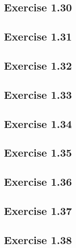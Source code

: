 \documentclass[letterpaper, leqno]{article}
\begin{document}
\subsection*{Exercise 1.30}
%

\subsection*{Exercise 1.31}
%

\subsection*{Exercise 1.32}
%

\subsection*{Exercise 1.33}
%

\subsection*{Exercise 1.34}
%

\subsection*{Exercise 1.35}
%

\subsection*{Exercise 1.36}
%

\subsection*{Exercise 1.37}
%

\subsection*{Exercise 1.38}
%
\end{document}
